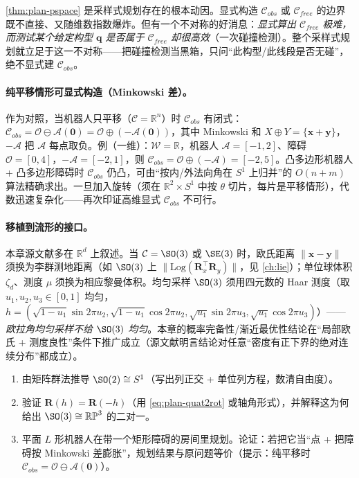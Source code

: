 \begin{insight}
\cref{thm:plan-pspace} 是采样式规划存在的根本动因。显式构造 $\mathcal{C}_{obs}$ 或 $\mathcal{C}_{free}$ 的边界既不直接、又随维数指数爆炸。但有一个不对称的好消息：\emph{显式算出 $\mathcal{C}_{free}$ 极难，而测试某个给定构型 $\mathbf{q}$ 是否属于 $\mathcal{C}_{free}$ 却很高效}（一次碰撞检测）。整个采样式规划就立足于这一不对称——把碰撞检测当黑箱，只问“此构型/此线段是否无碰”，绝不显式建 $\mathcal{C}_{obs}$。
\end{insight}

\paragraph{纯平移情形可显式构造（Minkowski 差）。}
作为对照，当机器人只平移（$\mathcal{C}=\mathbb{R}^n$）时 $\mathcal{C}_{obs}$ 有闭式：$\mathcal{C}_{obs}=\mathcal{O}\ominus\mathcal{A}(\mathbf{0})=\mathcal{O}\oplus(-\mathcal{A}(\mathbf{0}))$，其中 Minkowski 和 $X\oplus Y=\{\mathbf{x}+\mathbf{y}\}$，$-\mathcal{A}$ 把 $\mathcal{A}$ 每点取负。例（一维）：$\mathcal{W}=\mathbb{R}$，机器人 $\mathcal{A}=[-1,2]$、障碍 $\mathcal{O}=[0,4]$，$-\mathcal{A}=[-2,1]$，则 $\mathcal{C}_{obs}=\mathcal{O}\oplus(-\mathcal{A})=[-2,5]$。凸多边形机器人 + 凸多边形障碍时 $\mathcal{C}_{obs}$ 仍凸，可由“按内/外法向角在 $S^1$ 上归并”的 $O(n+m)$ 算法精确求出。一旦加入旋转（须在 $\mathbb{R}^2\times S^1$ 中按 $\theta$ 切片，每片是平移情形），代数迅速复杂化——再次印证高维显式 $\mathcal{C}_{obs}$ 不可行。

\paragraph{移植到流形的接口。}\rebuilt
本章源文献多在 $\mathbb{R}^d$ 上叙述。当 $\mathcal{C}=\SO(3)$ 或 $\SE(3)$ 时，欧氏距离 $\|\mathbf{x}-\mathbf{y}\|$ 须换为李群测地距离（如 $\SO(3)$ 上 $\|\mathrm{Log}(\mathbf{R}_x^\top\mathbf{R}_y)\|$，见 \cref{ch:lie}）；单位球体积 $\zeta_d$、测度 $\mu$ 须换为相应黎曼体积。均匀采样 $\SO(3)$ 须用四元数的 Haar 测度（取 $u_1,u_2,u_3\in[0,1]$ 均匀，$h=(\sqrt{1-u_1}\sin2\pi u_2,\sqrt{1-u_1}\cos2\pi u_2,\sqrt{u_1}\sin2\pi u_3,\sqrt{u_1}\cos2\pi u_3)$）——\emph{欧拉角均匀采样不给 $\SO(3)$ 均匀}。本章的概率完备性/渐近最优性结论在“局部欧氏 + 测度良性”条件下推广成立（源文献明言结论对任意“密度有正下界的绝对连续分布”都成立）。

\begin{practice}
\begin{enumerate}
  \item 由矩阵群法推导 $\SO(2)\cong S^1$（写出列正交 + 单位列方程，数清自由度）。
  \item 验证 $\mathbf{R}(h)=\mathbf{R}(-h)$（用 \cref{eq:plan-quat2rot} 或轴角形式），并解释这为何给出 $\SO(3)\cong\mathbb{RP}^3$ 的二对一。
  \item 平面 $L$ 形机器人在带一个矩形障碍的房间里规划。论证：若把它当“点 + 把障碍按 Minkowski 差膨胀”，规划结果与原问题等价（提示：纯平移时 $\mathcal{C}_{obs}=\mathcal{O}\ominus\mathcal{A}(\mathbf{0})$）。
\end{enumerate}
\end{practice}

